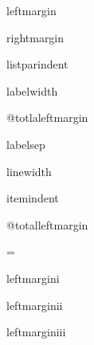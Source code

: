  
 \begin{docCommand}{leftmargin} {}
\end{docCommand}
\begin{docCommand}{rightmargin} {}
\end{docCommand}
\begin{docCommand}{listparindent} {}
\end{docCommand}
\begin{docCommand}{labelwidth} {}
\end{docCommand}
\begin{docCommand}{@totlaleftmargin} {}
\end{docCommand}
\begin{docCommand}{labelsep} {}
\end{docCommand}
\begin{docCommand}{linewidth} {}
\end{docCommand}
\begin{docCommand}{itemindent} {}
\end{docCommand}
 \begin{docCommand}{@totalleftmargin} {}
 \end{docCommand}


 
    \begin{teX}
\newdimen\leftmargin
\newdimen\rightmargin
\newdimen\listparindent
\newdimen\itemindent
\newdimen{}
\newdimen{}
\newdimen\linewidth
\newdimen\@totalleftmargin \@totalleftmargin=\z@
    \end{teX}
 
\begin{docCommand} {leftmargini} { }
\end{docCommand}
\begin{teX}
\newdimen\leftmargini
\end{teX}
\begin{docCommand} {leftmarginii} { }
\end{docCommand}
\begin{teX}
\newdimen\leftmarginii
\end{teX}

\begin{docCommand} {leftmarginiii} { }
\end{docCommand}
\begin{teX}
\newdimen\leftmarginiii
\end{teX}

